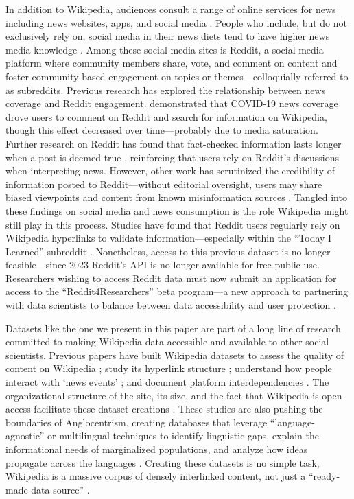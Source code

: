 In addition to Wikipedia, audiences consult a range of online services for news including news websites, apps, and social media \cite{st_aubin_news_2024,vraga_news_2021}. People who include, but do not exclusively rely on, social media in their news diets tend to have higher news media knowledge \cite{schulz_role_2024}. Among these social media sites is Reddit, a social media platform where community members share, vote, and comment on content and foster community-based engagement on topics or themes---colloquially referred to as subreddits. Previous research has explored the relationship between news coverage and Reddit engagement. \citet{gozzi_collective_2020} demonstrated that COVID-19 news coverage drove users to comment on Reddit and search for information on Wikipedia, though this effect decreased over time---probably due to media saturation. Further research on Reddit has found that fact-checked information lasts longer when a post is deemed true \cite{bond_engagement_2023}, reinforcing that users rely on Reddit's discussions when interpreting news. However, other work has scrutinized the credibility of information posted to Reddit---without editorial oversight, users may share biased viewpoints and content from known misinformation sources \cite{chipidza_ideological_2022}. Tangled into these findings on social media and news consumption is the role Wikipedia might still play in this process. Studies have found that Reddit users regularly rely on Wikipedia hyperlinks to validate information---especially within the ``Today I Learned'' subreddit \cite{moyer_determining_2015, vincent_examining_2018}. Nonetheless, access to this previous dataset is no longer feasible---since 2023 Reddit’s API is no longer available for free public use. Researchers wishing to access Reddit data must now submit an application for access to the ``Reddit4Researchers'' beta program---a new approach to partnering with data scientists to balance between data accessibility and user protection \cite{perez_reddit_2024}.

Datasets like the one we present in this paper are part of a long line of research committed to making Wikipedia data accessible and available to other social scientists. Previous papers have built Wikipedia datasets to assess the quality of content on Wikipedia \cite{das_language-agnostic_2024}; study its hyperlink structure \cite{consonni_wikilinkgraphs_2019}; understand how people interact with ‘news events’ \cite{gildersleve_between_2023}; and document platform interdependencies \cite{meier_twikiltwitter_2022}. The organizational structure of the site, its size, and the fact that Wikipedia is open access facilitate these dataset creations \cite{mitrevski_wikihist_2020}. These studies are also pushing the boundaries of Anglocentrism, creating databases that leverage ``language-agnostic'' or multilingual techniques to identify linguistic gaps, explain the informational needs of marginalized populations, and analyze how ideas propagate across the languages \cite{das_language-agnostic_2024,valentim_tracking_2021,miquel-ribe_wikipedia_2019}. Creating these datasets is no simple task, Wikipedia is a massive corpus of densely interlinked content, not just a ``ready-made data source'' \cite{gildersleve_between_2023,valentim_tracking_2021}. 

